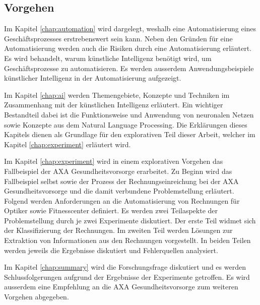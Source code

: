 


\subsection{Vorgehen}

Im Kapitel \ref{chap:automation} wird dargelegt, weshalb eine Automatisierung eines Geschäftsprozesses erstrebenswert sein kann. Neben den Gründen für eine Automatisierung werden auch die Risiken durch eine Automatisierung erläutert. Es wird behandelt, warum künstliche Intelligenz benötigt wird, um Geschäftsprozesse zu automatisieren. Es werden ausserdem Anwendungsbeispiele künstlicher Intelligenz in der Automatisierung aufgezeigt.

Im Kapitel \ref{chap:ai} werden Themengebiete, Konzepte und Techniken im Zusammenhang mit der künstlichen Intelligenz erläutert. Ein wichtiger Bestandteil dabei ist die Funktionsweise und Anwendung von neuronalen Netzen sowie Konzepte aus dem Natural Language Processing. Die Erklärungen dieses Kapitels dienen als Grundlage für den explorativen Teil dieser Arbeit, welcher im Kapitel \ref{chap:experiment} erläutert wird.

Im Kapitel \ref{chap:experiment} wird in einem explorativen Vorgehen das Fallbeispiel der AXA Gesundheits\-vorsorge erarbeitet. Zu Beginn wird das Fallbeispiel selbst sowie der Prozess der Rechnungseinreichung bei der AXA Gesundheitsvorsorge und die damit verbundene Problemstellung erläutert. Folgend werden Anforderungen an die Automatisierung von Rechnungen für Optiker sowie Fitnesscenter definiert. Es werden zwei Teilaspekte der Problemstellung durch je zwei Experimente diskutiert. Der erste Teil widmet sich der Klassifizierung der Rechnungen. Im zweiten Teil werden Lösungen zur Extraktion von Informationen aus den Rechnungen vorgestellt. In beiden Teilen werden jeweils die Ergebnisse diskutiert und Fehlerquellen analysiert. 

Im Kapitel \ref{chap:summary} wird die Forschungsfrage diskutiert und es werden Schlussfolgerungen aufgrund der Ergebnisse der Experimente getroffen. Es wird ausserdem eine Empfehlung an die AXA Gesundheitsvorsorge zum weiteren Vorgehen abgegeben.

